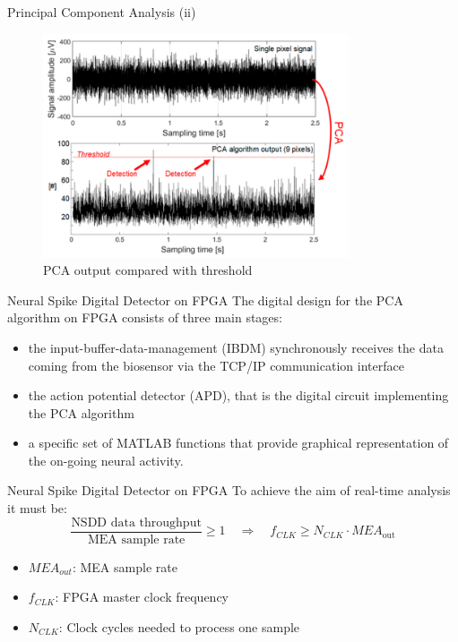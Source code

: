 \documentclass{beamer}
\begin{document}
\begin{frame}{Principal Component Analysis (ii)}
\begin{figure}
    \centering     
    \vspace{-0.6cm}
    \includegraphics[width=9cm]{pca_1.png}
    \caption{PCA output compared with threshold}
\end{figure}
\end{frame}

\begin{frame}{Neural Spike Digital Detector on FPGA}
    The digital design for the PCA algorithm on FPGA consists of three main stages:
    \begin{itemize}
    	\item  the input-buffer-data-management (IBDM) synchronously receives the data coming from the biosensor via the TCP/IP communication interface
    	\item the action potential detector (APD), that is the digital circuit     implementing the PCA algorithm
    	\item a specific set of MATLAB functions that provide graphical representation of the on-going neural activity.
    \end{itemize}
\end{frame}

\begin{frame}{Neural Spike Digital Detector on FPGA}
To achieve the aim of real-time analysis it must be:
\begin{equation}
    \frac{\mbox{NSDD data throughput}}{\mbox{MEA sample rate}}\ge 1 \quad 
    \Rightarrow\quad f_{CLK}\ge N_{CLK}\cdot MEA_{\mbox{out}}
\end{equation}
\begin{itemize}
    \item $MEA_{out}$: MEA sample rate
    \item $f_{CLK}$: FPGA master clock frequency
    \item $N_{CLK}$: Clock cycles needed to process one sample 
\end{itemize}
\end{frame}
\end{document}
